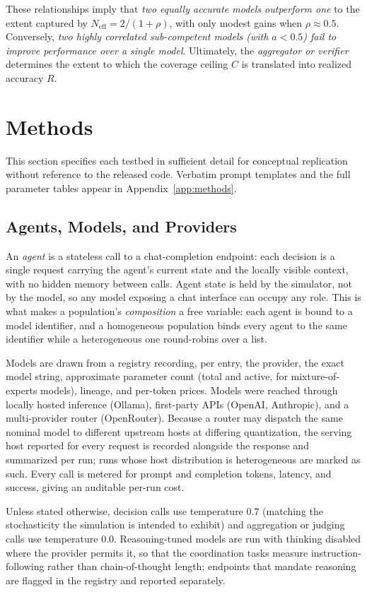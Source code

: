 \documentclass[manuscript,screen,review]{acmart}
\begin{document}
These relationships imply that \emph{two equally accurate models outperform one} to the extent captured by $N_{\mathrm{eff}} = 2/(1+\rho)$, with only modest gains when $\rho \approx 0.5$. Conversely, \emph{two highly correlated sub-competent models (with $a<0.5$) fail to improve performance over a single model}. Ultimately, the \emph{aggregator or verifier} determines the extent to which the coverage ceiling $C$ is translated into realized accuracy $R$.

\section{Methods}
\label{sec:methods}
This section specifies each testbed in sufficient detail for conceptual
replication without reference to the released code. Verbatim prompt templates and
the full parameter tables appear in Appendix~\ref{app:methods}.

\subsection{Agents, Models, and Providers}
\label{sec:methods-models}
An \emph{agent} is a stateless call to a chat-completion endpoint: each decision
is a single request carrying the agent's current state and the locally visible
context, with no hidden memory between calls. Agent state is held by the
simulator, not by the model, so any model exposing a chat interface can occupy
any role. This is what makes a population's \emph{composition} a free variable:
each agent is bound to a model identifier, and a homogeneous population binds
every agent to the same identifier while a heterogeneous one round-robins over a
list.

Models are drawn from a registry recording, per entry, the provider, the exact
model string, approximate parameter count (total and active, for
mixture-of-experts models), lineage, and per-token prices. Models were reached
through locally hosted inference (Ollama), first-party APIs (OpenAI, Anthropic),
and a multi-provider router (OpenRouter). Because a router may dispatch the same
nominal model to different upstream hosts at differing quantization, the serving
host reported for every request is recorded alongside the response and
summarized per run; runs whose host distribution is heterogeneous are marked as
such. Every call is metered for prompt and completion tokens, latency, and
success, giving an auditable per-run cost.

Unless stated otherwise, decision calls use temperature $0.7$ (matching the
stochasticity the simulation is intended to exhibit) and aggregation or judging
calls use temperature $0.0$. Reasoning-tuned models are run with thinking
disabled where the provider permits it, so that the coordination tasks measure
instruction-following rather than chain-of-thought length; endpoints that
mandate reasoning are flagged in the registry and reported separately.
\end{document}
